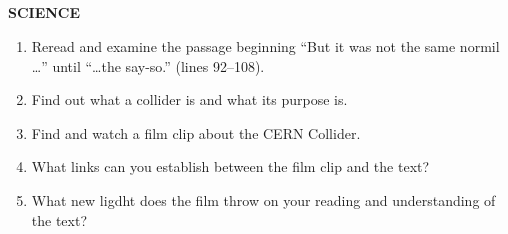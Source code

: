 \documentclass[10pt,a4paper,table]{article}
\newcommand{\qm}[1]{``#1''}
\begin{document}
\subsection{}
\textbf{SCIENCE}
\begin{enumerate}[label=\arabic*., leftmargin=*]
  \item Reread and examine the passage beginning \qm{But it was not the same normil \ldots} until \qm{\ldots the say-so.} (lines 92--108).
  \item Find out what a collider is and what its purpose is.
  \item Find and watch a film clip about the CERN Collider.
  \item What links can you establish between the film clip and the text?
  \item What new ligdht does the film throw on your reading and understanding of the text?
\end{enumerate}
\end{document}

